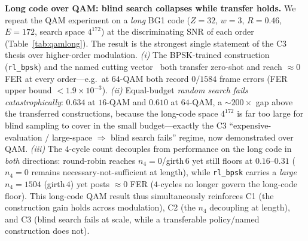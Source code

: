 \documentclass[journal]{IEEEtran}
\begin{document}
\textbf{Long code over QAM: blind search collapses while transfer holds.}
We repeat the QAM experiment on a \emph{long} BG1 code ($Z{=}32$, $w{=}3$,
$R{=}0.46$, $E{=}172$, search space $4^{172}$) at the discriminating SNR of each
order (Table~\ref{tab:qamlong}). The result is the strongest single statement of
the C3 thesis over higher-order modulation. \emph{(i)} The BPSK-trained
construction (\texttt{rl\_bpsk}) and the named cutting
vector~\cite{mitchell2015scldpc} both transfer zero-shot and reach
$\approx\!0$ FER at every order---e.g.\ at $64$-QAM both record $0/1584$ frame
errors (FER upper bound $<1.9\times10^{-3}$). \emph{(ii)} Equal-budget
\emph{random search} \emph{fails catastrophically}: $0.634$ at $16$-QAM and
$0.610$ at $64$-QAM, a $\sim\!200\times$ gap above the transferred constructions,
because the long-code space $4^{172}$ is far too large for blind sampling to cover
in the small budget---exactly the C3 ``expensive-evaluation / large-space
$\Rightarrow$ blind search fails'' regime, now demonstrated over QAM. \emph{(iii)}
The $4$-cycle count decouples from performance on the long code in \emph{both}
directions: round-robin reaches $n_4{=}0$/girth\,$6$ yet still floors at
$0.16$--$0.31$ ($n_4{=}0$ remains necessary-not-sufficient at length), while
\texttt{rl\_bpsk} carries a \emph{large} $n_4{=}1504$ (girth\,$4$) yet posts
$\approx\!0$ FER ($4$-cycles no longer govern the long-code floor). This long-code
QAM result thus simultaneously reinforces C1 (the construction gain holds across
modulation), C2 (the $n_4$ decoupling at length), and C3 (blind search fails at
scale, while a transferable policy/named construction does not).
\end{document}
